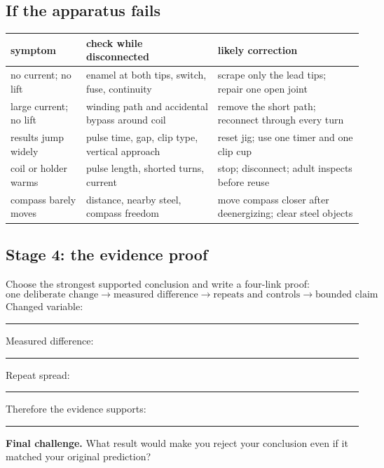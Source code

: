 {\subsection*{If the apparatus fails}
\begin{center}\small
\begin{tabularx}{\linewidth}{@{}p{.24\linewidth}X X@{}}\toprule
symptom & check while disconnected & likely correction\\\midrule
no current; no lift & enamel at both tips, switch, fuse, continuity & scrape only the lead tips; repair one open joint\\
large current; no lift & winding path and accidental bypass around coil & remove the short path; reconnect through every turn\\
results jump widely & pulse time, gap, clip type, vertical approach & reset jig; use one timer and one clip cup\\
coil or holder warms & pulse length, shorted turns, current & stop; disconnect; adult inspects before reuse\\
compass barely moves & distance, nearby steel, compass freedom & move compass closer after deenergizing; clear steel objects\\
\bottomrule\end{tabularx}
\end{center}

\subsection*{Stage 4: the evidence proof}
Choose the strongest supported conclusion and write a four-link proof:
\[
\boxed{\text{one deliberate change}}
\longrightarrow
\boxed{\text{measured difference}}
\longrightarrow
\boxed{\text{repeats and controls}}
\longrightarrow
\boxed{\text{bounded claim}}
\]
\noindent Changed variable: \rule{35mm}{.4pt}\quad Measured difference: \rule{42mm}{.4pt}

\noindent Repeat spread: \rule{28mm}{.4pt}\quad Therefore the evidence supports: \rule{70mm}{.4pt}

\noindent\textbf{Final challenge.} What result would make you reject your conclusion even if it matched your original prediction?
}
\def\explanation{Current in every turn produces a magnetic field. With the turns wound in the same sense, their axial fields reinforce. The iron core magnetizes and offers a strong path for flux, so it can increase the force at the bolt pole. Reversing current reverses north and south; it does not, by itself, predict a large strength change. Turn count is not the only influence: current, geometry, core, gap, pulse time, and heating can all alter the observation. That is why repeats and controlled variables are part of the physical argument, not paperwork after it.}
\def\extension{Graph mean lift against \(20\), \(30\), and \(40\) turns. Include a vertical uncertainty bar spanning the lowest to highest trial. Before calling the graph a ``turns'' result, inspect whether current changed as added wire increased resistance. State the narrower claim your measurements actually justify.}

